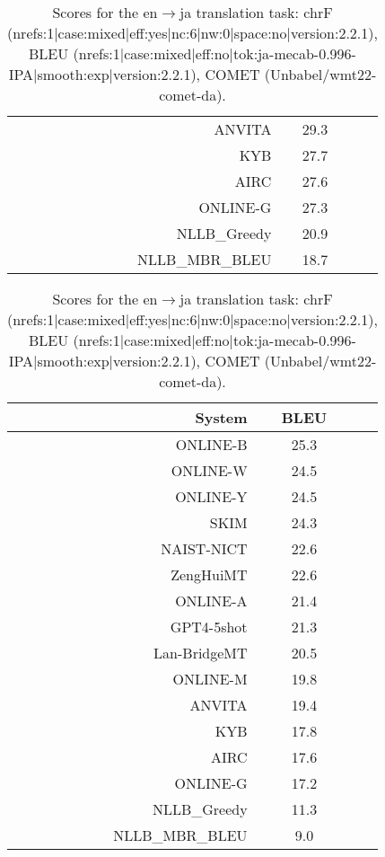 \documentclass[11pt]{article}
\begin{document}
\begin{table}
\begin{subtable}[t]{0.33\textwidth}
\begin{tabular}{rcc}
ANVITA  & 29.3 \\ 
\rowcolor{ashgrey} KYB  & 27.7 \\ 
AIRC &  27.6 \\ 
\rowcolor{ashgrey} ONLINE-G  & 27.3 \\ 
\rowcolor{ashgrey} NLLB\_Greedy  & 20.9 \\ 
\rowcolor{ashgrey} NLLB\_MBR\_BLEU  & 18.7 \\ 
\bottomrule 
\end{tabular} 
\end{subtable} 
\begin{subtable}[t]{0.33\textwidth}
\begin{tabular}{rcc}
\toprule 
System  & BLEU \\ 
\midrule 
\rowcolor{ashgrey} ONLINE-B  & 25.3 \\ 
\rowcolor{ashgrey} ONLINE-W  & 24.5 \\ 
\rowcolor{ashgrey} ONLINE-Y  & 24.5 \\ 
SKIM & 24.3 \\ 
NAIST-NICT  & 22.6 \\ 
\rowcolor{ashgrey} ZengHuiMT  & 22.6 \\ 
\rowcolor{ashgrey} ONLINE-A  & 21.4 \\ 
\rowcolor{ashgrey} GPT4-5shot  & 21.3 \\ 
\rowcolor{ashgrey} Lan-BridgeMT  & 20.5 \\ 
\rowcolor{ashgrey} ONLINE-M  & 19.8 \\ 
ANVITA  & 19.4 \\ 
\rowcolor{ashgrey} KYB  & 17.8 \\ 
AIRC  & 17.6 \\ 
\rowcolor{ashgrey} ONLINE-G  & 17.2 \\ 
\rowcolor{ashgrey} NLLB\_Greedy  & 11.3 \\ 
\rowcolor{ashgrey} NLLB\_MBR\_BLEU  & 9.0 \\ 
\bottomrule 
\end{tabular} 
\end{subtable}  
\caption{Scores for the en$\rightarrow$ja translation task: chrF (nrefs:1|case:mixed|eff:yes|nc:6|nw:0|space:no|version:2.2.1), BLEU (nrefs:1|case:mixed|eff:no|tok:ja-mecab-0.996-IPA|smooth:exp|version:2.2.1), COMET (Unbabel/wmt22-comet-da).} 
\end{table} 
\end{document}
